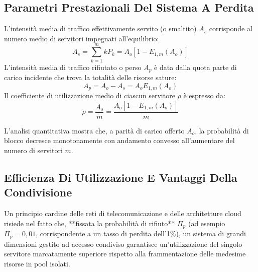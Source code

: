\documentclass[11pt, a4paper]{article}
\begin{document}
\subsection{Parametri Prestazionali Del Sistema A Perdita}

L'intensità media di traffico effettivamente servito (o smaltito) $A_s$ corrisponde al numero medio di servitori impegnati all'equilibrio:
\[
A_s = \sum_{k=1}^m k P_k = A_o [1 - E_{1,m}(A_o)]
\]
L'intensità media di traffico rifiutato o perso $A_p$ è data dalla quota parte di carico incidente che trova la totalità delle risorse sature:
\[
A_p = A_o - A_s = A_o E_{1,m}(A_o)
\]
Il coefficiente di utilizzazione medio di ciascun servitore $\rho$ è espresso da:
\[
\boxed{\rho = \frac{A_s}{m} = \frac{A_o [1 - E_{1,m}(A_o)]}{m}}
\]


L'analisi quantitativa mostra che, a parità di carico offerto $A_o$, la probabilità di blocco decresce monotonamente con andamento convesso all'aumentare del numero di servitori $m$.



\subsection{Efficienza Di Utilizzazione E Vantaggi Della Condivisione}

Un principio cardine delle reti di telecomunicazione e delle architetture cloud risiede nel fatto che, **fissata la probabilità di rifiuto** $\Pi_p$ (ad esempio $\Pi_p = 0{,}01$, corrispondente a un tasso di perdita dell'1\%), un sistema di grandi dimensioni gestito ad accesso condiviso garantisce un'utilizzazione del singolo servitore marcatamente superiore rispetto alla frammentazione delle medesime risorse in pool isolati.

\end{document}
